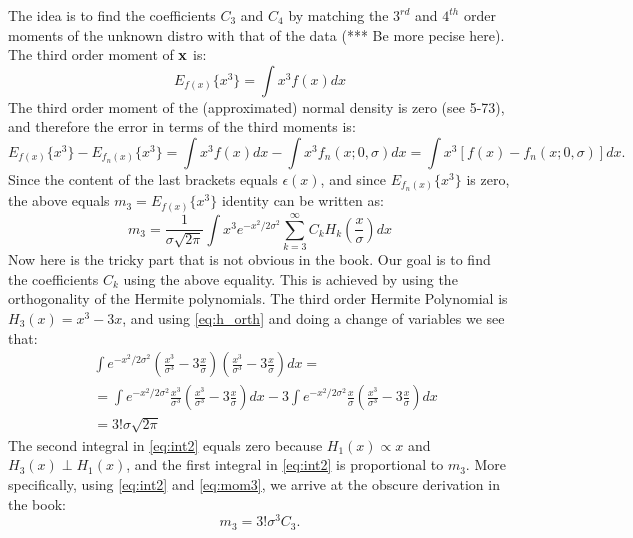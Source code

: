 \documentclass[a4paper, oneside]{book}
\begin{document}
The idea is to find the coefficients $C_3$ and $C_4$ by matching the $3^{rd}$ and $4^{th}$ order moments of the unknown distro with that of the data (*** Be more pecise here). The third order moment of $\mathbf{x}$ is:
%
\begin{equation}
E_{f(x)}\{x^3\} = \int x^3 f(x) dx
\end{equation}
%
The third order moment of the (approximated) normal density is zero (see 5-73), and therefore the error in terms of the third moments is:
\begin{equation}
E_{f(x)}\{x^3\} - E_{f_n(x)}\{x^3\} = \int x^3 f(x) dx - \int x^3 f_n(x; 0, \sigma) dx = \int x^3\left[f(x)-f_n(x; 0, \sigma)\right] dx.
\end{equation}
Since the content of the last brackets equals $\epsilon(x)$, and since $ E_{f_n(x)}\{x^3\}$ is zero, the above equals $m_3 = E_{f(x)}\{x^3\}$ identity can be written as:
%
\begin{equation}
m_3 = \frac{1}{\sigma \sqrt{2\pi}} \int x^3 e^{-x^2/2\sigma^2}\sum\limits_{k=3}^\infty C_k H_k\left(\frac{x}{\sigma}\right) dx \label{eq:mom3}
\end{equation}
%
Now here is the tricky part that is not obvious in the book. Our goal is to find the coefficients $C_k$ using the above equality. This is achieved by using the orthogonality of the Hermite polynomials. The third order Hermite Polynomial is $H_3(x) = x^3-3x$, and using \eqref{eq:h_orth} and doing a change of variables we see that:
%
\begin{align}
&\int e^{-x^2/2\sigma^2} \left(\frac{x^3}{\sigma^3}-3\frac{x}{\sigma}\right)\left(\frac{x^3}{\sigma^3}-3\frac{x}{\sigma}\right)dx = \\
&=\int e^{-x^2/2\sigma^2} \frac{x^3}{\sigma^3}\left(\frac{x^3}{\sigma^3}-3\frac{x}{\sigma}\right)dx -3\int e^{-x^2/2\sigma^2} \frac{x}{\sigma}\left(\frac{x^3}{\sigma^3}-3\frac{x}{\sigma}\right)dx \label{eq:int2}\\
&=3!\sigma \sqrt{2\pi}
\end{align}
%
The second integral in \eqref{eq:int2} equals zero because $H_1(x)\propto x$ and $H_3(x)\perp H_1(x)$, and the first integral in \eqref{eq:int2} is proportional to $m_3$. More specifically, using \eqref{eq:int2} and \eqref{eq:mom3}, we arrive at the obscure derivation in the book:
%
\begin{equation}
m_3 = 3! \sigma^3 C_3.
\end{equation}




















\printindex
\end{document}
